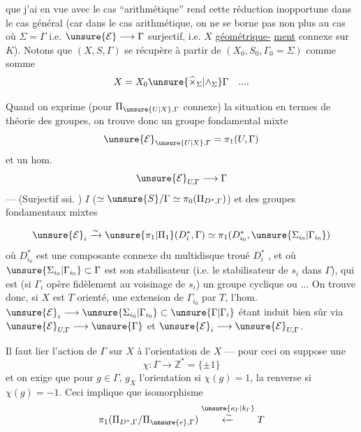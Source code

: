 
que j'ai en vue avec le cas ``arithmétique''
rend cette réduction inopportune dans le
cas général (car dans le cas arithmétique,
on ne se borne pas non plus au cas où
$\Sigma=\Gamma$ i.e. $\unsure{\mathcal E}\longrightarrow\Gamma$ surjectif, i.e. 
$X$ \uline{géométrique-}
\uline{ment} connexe sur $K$). Notons  que
$(X,S,\Gamma)$ se récupère à partir de
$(X_0,S_0,\Gamma_0=\Sigma)$ comme somme 
\[
X=X_0\unsure{\widehat\times_{\Sigma}|\wedge_{\Sigma}}\Gamma\quad ....
\]

Quand on exprime (pour $\Pi_{\unsure{U|X},\Gamma}$ connexe)
la situation en termes de théorie des groupes,
on trouve donc  un groupe
fondamental  mixte
\[
\unsure{\mathcal E}_{\unsure{U|X},\Gamma}=\pi_1(U,\Gamma)
\]
et un hom.
\[
\unsure{\mathcal E}_{U,\Gamma}\longrightarrow\Gamma
\]
--- (Surjectif ssi. 
)
$I$ ($\simeq\unsure{S}/\Gamma\simeq\pi_0(\Pi_{D^*,\Gamma})$) et des
groupes fondamentaux mixtes


\[
\unsure{\mathcal E}_i\xrightarrow{\sim}\unsure{\pi_1|\Pi_1}(D_i^*,\Gamma)
\simeq\pi_1(D_{i_0}^*,\unsure{\Sigma_{i_0}|\Gamma_{i_0}})
\]
où $D_{i_0}^*$ est une composante connexe du
multidisque troué $D_i^*$ , et où $\unsure{\Sigma_{i_0}|\Gamma_{i_0}}\subset\Gamma$ est
son stabilisateur (i.e. le stabilisateur de
$s_i$ dans $\Gamma$), qui est  (si $\Gamma_i$  opère
fidèlement au voisinage de $s_i$) un groupe cyclique
ou  ... On trouve donc, si $X$ est
$T$ orienté, une extension de $\Gamma_{i_0}$ par $T$,
l'hom. $\unsure{\mathcal E}_i\longrightarrow\unsure{\Sigma_{i_0}|\Gamma_{i_0}}\subset\unsure{\Gamma|\Gamma_i}$ étant induit
bien sûr via $\unsure{\mathcal E}_{U,\Gamma}\longrightarrow\unsure{\Gamma}$ et $\unsure{\mathcal E}_i\longrightarrow\unsure{\mathcal E}_{U,\Gamma}$.

Il faut  lier l'action de $\Gamma$ sur $X$ à
l'orientation de $X$ --- pour ceci on suppose
 une 
\[
\chi:\Gamma\longrightarrow\mathbb Z^*=\{\pm1\}
\]
et on exige que pour $g\in\Gamma$, $g_X$ 
l'orientation si $\chi(g)=1$, la renverse si $\chi(g)=-1$.
Ceci implique que  isomorphisme
\[
\pi_1(\Pi_{D^*,\Gamma}/\Pi_{\unsure{e},\Gamma})
\overset{\unsure{\kappa_\Gamma|k_\Gamma}}{\xleftarrow{\sim}}T
\]

